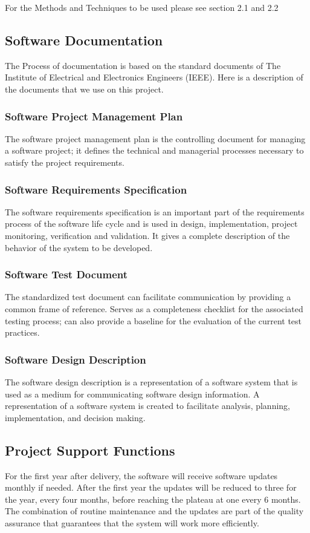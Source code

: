 \documentclass[12pt]{article}
\begin{document}
For the Methods and Techniques to be used please see section 2.1 and 2.2

\subsection{Software Documentation}
The Process of documentation is based on the standard documents of The Institute of Electrical and Electronics Engineers (IEEE). Here is a description of the documents that we use on this project.

\subsubsection{Software Project Management Plan}
The software project management plan is the controlling document for managing a software project; it defines the technical and managerial processes necessary to satisfy the project requirements.

\subsubsection{Software Requirements Specification}
The software requirements specification is an important part of the requirements process of the software life cycle and is used in design, implementation, project monitoring, verification and validation. It gives a complete description of the behavior of the system to be developed.

\subsubsection{Software Test Document}
The standardized test document can facilitate communication by providing a common frame of reference. Serves as a completeness checklist for the associated testing process; can also provide a baseline for the evaluation of the current test practices.

\subsubsection{Software Design Description}
The software design description is a representation of a software system that is used as a medium for communicating software design information. A representation of a software system is created to facilitate analysis, planning, implementation, and decision making.

\subsection{Project Support Functions}
For the first year after delivery, the software will receive software updates monthly if needed. After the first year the updates will be reduced to three for the year, every four months, before reaching the plateau at one every 6 months. The combination of routine maintenance and the updates are part of the quality assurance that guarantees that the system will work more efficiently.
\end{document}
